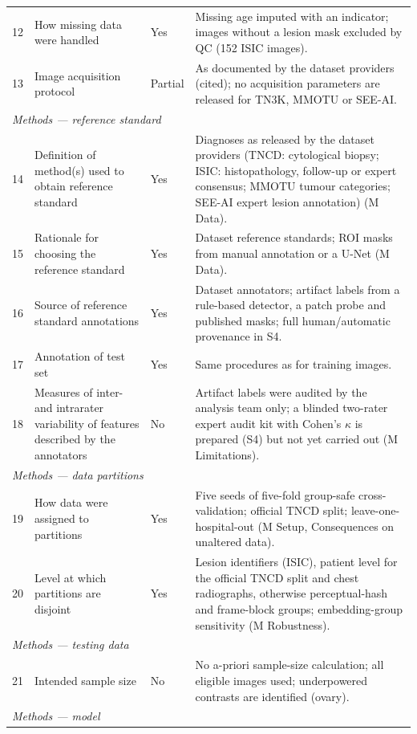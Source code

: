 {\begin{longtable}{p{0.4cm}p{6.2cm}p{0.9cm}p{7.3cm}}
12 & How missing data were handled & Yes & Missing age imputed with an indicator; images without a lesion mask excluded by QC (152 ISIC images). \\
13 & Image acquisition protocol & Partial & As documented by the dataset providers (cited); no acquisition parameters are released for TN3K, MMOTU or SEE-AI. \\
\multicolumn{4}{l}{\emph{Methods --- reference standard}}\\
14 & Definition of method(s) used to obtain reference standard & Yes & Diagnoses as released by the dataset providers (TNCD: cytological biopsy; ISIC: histopathology, follow-up or expert consensus; MMOTU tumour categories; SEE-AI expert lesion annotation) (M Data). \\
15 & Rationale for choosing the reference standard & Yes & Dataset reference standards; ROI masks from manual annotation or a U-Net (M Data). \\
16 & Source of reference standard annotations & Yes & Dataset annotators; artifact labels from a rule-based detector, a patch probe and published masks; full human/automatic provenance in S4. \\
17 & Annotation of test set & Yes & Same procedures as for training images. \\
18 & Measures of inter- and intrarater variability of features described by the annotators & No & Artifact labels were audited by the analysis team only; a blinded two-rater expert audit kit with Cohen's $\kappa$ is prepared (S4) but not yet carried out (M Limitations). \\
\multicolumn{4}{l}{\emph{Methods --- data partitions}}\\
19 & How data were assigned to partitions & Yes & Five seeds of five-fold group-safe cross-validation; official TNCD split; leave-one-hospital-out (M Setup, Consequences on unaltered data). \\
20 & Level at which partitions are disjoint & Yes & Lesion identifiers (ISIC), patient level for the official TNCD split and chest radiographs, otherwise perceptual-hash and frame-block groups; embedding-group sensitivity (M Robustness). \\
\multicolumn{4}{l}{\emph{Methods --- testing data}}\\
21 & Intended sample size & No & No a-priori sample-size calculation; all eligible images used; underpowered contrasts are identified (ovary). \\
\multicolumn{4}{l}{\emph{Methods --- model}}\\

\end{longtable}}

